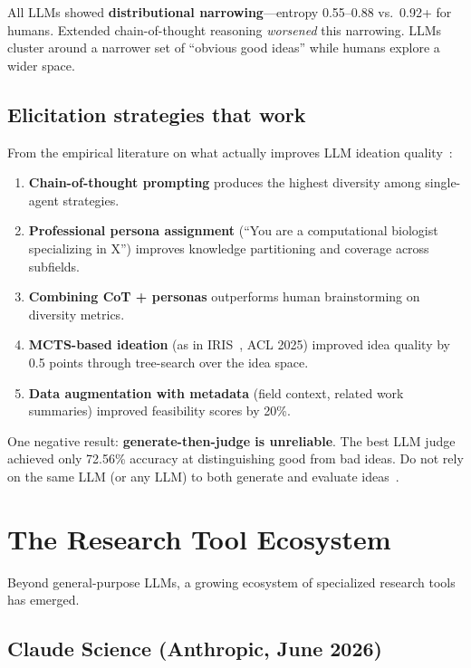 \documentclass[11pt,a4paper]{article}
\begin{document}
All LLMs showed \textbf{distributional narrowing}---entropy 0.55--0.88 vs.\ 0.92+ for humans. Extended chain-of-thought reasoning \emph{worsened} this narrowing. LLMs cluster around a narrower set of ``obvious good ideas'' while humans explore a wider space.

\subsection{Elicitation strategies that work}

From the empirical literature on what actually improves LLM ideation quality~\cite{si2025,ideationarena2026,iris2025}:

\begin{enumerate}
\item \textbf{Chain-of-thought prompting} produces the highest diversity among single-agent strategies.
\item \textbf{Professional persona assignment} (``You are a computational biologist specializing in X'') improves knowledge partitioning and coverage across subfields.
\item \textbf{Combining CoT + personas} outperforms human brainstorming on diversity metrics.
\item \textbf{MCTS-based ideation} (as in IRIS~\cite{iris2025}, ACL 2025) improved idea quality by 0.5 points through tree-search over the idea space.
\item \textbf{Data augmentation with metadata} (field context, related work summaries) improved feasibility scores by 20\%.
\end{enumerate}

One negative result: \textbf{generate-then-judge is unreliable}. The best LLM judge achieved only 72.56\% accuracy at distinguishing good from bad ideas. Do not rely on the same LLM (or any LLM) to both generate and evaluate ideas~\cite{ideationarena2026}.


\section{The Research Tool Ecosystem}
\label{sec:tools}

Beyond general-purpose LLMs, a growing ecosystem of specialized research tools has emerged.

\subsection{Claude Science (Anthropic, June 2026)}
\end{document}
